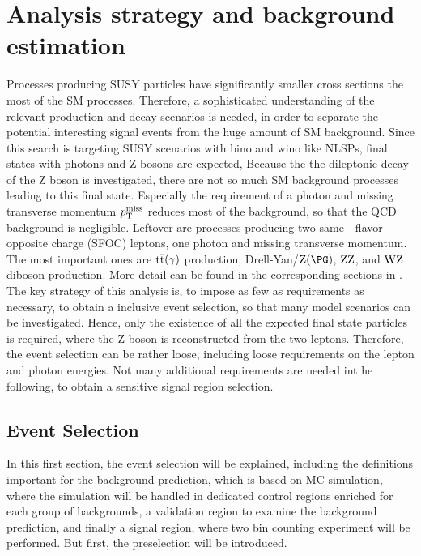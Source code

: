 \chapter{Analysis strategy and background estimation}\label{chap:analysis}

Processes producing SUSY particles have significantly smaller cross sections the most of the SM processes. Therefore, a sophisticated understanding of the relevant production and decay scenarios is needed, in order to separate the potential interesting signal events from the huge amount of SM background. Since this search is targeting SUSY scenarios with bino and wino like NLSPs, final states with photons and Z bosons are expected, Because the the dileptonic decay of the Z boson is investigated, there are not so much SM background processes leading to this final state. Especially the requirement of a photon and missing transverse momentum $p_{\mathrm{T}}^\text{miss}$ reduces most of the background, so that \eg the QCD background is negligible. Leftover are processes producing two same - flavor opposite charge (SFOC) leptons, one photon and missing transverse momentum. The most important ones are ${\mathrm{t}\overline{\mathrm{t}}}(\gamma)$ production, Drell-Yan/$\PZ(\PG)$, $\mathrm{Z}\mathrm{Z}$, and $\mathrm{W}\mathrm{Z}$ diboson production. More detail can be found in the corresponding sections in .\\
The key strategy of this analysis is, to impose as few as requirements as necessary, to obtain a inclusive event selection, so that many model scenarios can be investigated. Hence, only the existence of all the expected final state particles is required, where the Z boson is reconstructed from the two leptons. Therefore, the event selection can be rather loose, including loose requirements on the lepton and photon energies. Not many additional requirements are needed int he following, to obtain a sensitive signal region selection.

\section{Event Selection}
In this first section, the event selection will be explained, including the definitions important for the background prediction, which is based on MC simulation, where the simulation will be handled in dedicated control regions enriched for each group of backgrounds, a validation region to examine the background prediction, and finally a signal region, where two bin counting experiment will be performed. But first, the preselection will be introduced.
